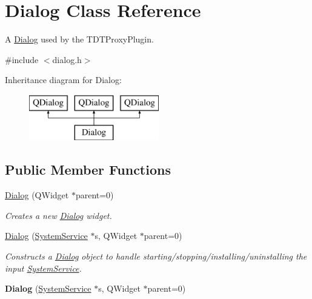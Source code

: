\hypertarget{class_dialog}{\section{Dialog Class Reference}
\label{class_dialog}
}


A \hyperlink{class_dialog}{Dialog} used by the T\-D\-T\-Proxy\-Plugin.  




{\ttfamily \#include $<$dialog.\-h$>$}

Inheritance diagram for Dialog\-:\begin{figure}[H]
\begin{center}
\leavevmode
\includegraphics[height=2.000000cm]{class_dialog}
\end{center}
\end{figure}
\subsection*{Public Member Functions}
\begin{DoxyCompactItemize}
\item 
\hyperlink{class_dialog_acfa2063f9f962d394c6a645b6e7e08d8}{Dialog} (Q\-Widget $\ast$parent=0)
\begin{DoxyCompactList}\small\item\em Creates a new \hyperlink{class_dialog}{Dialog} widget. \end{DoxyCompactList}\item 
\hypertarget{class_dialog_ade4c833de137c5c206ff1ac1d3cd623d}{\hyperlink{class_dialog_ade4c833de137c5c206ff1ac1d3cd623d}{Dialog} (\hyperlink{class_system_service}{System\-Service} $\ast$s, Q\-Widget $\ast$parent=0)}\label{class_dialog_ade4c833de137c5c206ff1ac1d3cd623d}

\begin{DoxyCompactList}\small\item\em Constructs a \hyperlink{class_dialog}{Dialog} object to handle starting/stopping/installing/uninstalling the input \hyperlink{class_system_service}{System\-Service}. \end{DoxyCompactList}\item 
\hypertarget{class_dialog_ade4c833de137c5c206ff1ac1d3cd623d}{{\bfseries Dialog} (\hyperlink{class_system_service}{System\-Service} $\ast$s, Q\-Widget $\ast$parent=0)}\label{class_dialog_ade4c833de137c5c206ff1ac1d3cd623d}

\end{DoxyCompactItemize}
